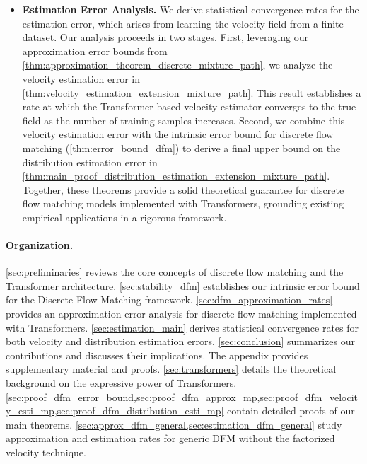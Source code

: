\documentclass[12pt]{article}
\numberwithin{equation}{section}
\let\cite\citep
\theoremstyle{theoremstyle}
\numberwithin{equation}{section}
\numberwithin{theorem}{section}
\numberwithin{proposition}{section}
\numberwithin{definition}{section}
\numberwithin{lemma}{section}
\numberwithin{assumption}{section}
\numberwithin{remark}{section}
\begin{document}
\begin{itemize}
    \item \textbf{Estimation Error Analysis.}
    We derive statistical convergence rates for the estimation error, which arises from learning the velocity field from a finite dataset. 
    Our analysis proceeds in two stages. First, leveraging our approximation error bounds from \cref{thm:approximation_theorem_discrete_mixture_path}, we analyze the velocity estimation error in \cref{thm:velocity_estimation_extension_mixture_path}. 
    This result establishes a rate at which the Transformer-based velocity estimator converges to the true field as the number of training samples increases. 
    Second, we combine this velocity estimation error with the intrinsic error bound for discrete flow matching (\cref{thm:error_bound_dfm}) to derive a final upper bound on the distribution estimation error in \cref{thm:main_proof_distribution_estimation_extension_mixture_path}. 
    Together, these theorems provide a solid theoretical guarantee for discrete flow matching models implemented with Transformers, grounding existing empirical applications \cite{fuest2025maskflow,qin2024defog,yi2025all} in a rigorous framework.
\end{itemize}

\paragraph{Organization.}
\cref{sec:preliminaries} reviews the core concepts of discrete flow matching and the Transformer architecture.
\cref{sec:stability_dfm} establishes our intrinsic error bound for the Discrete Flow Matching framework.
\cref{sec:dfm_approximation_rates} provides an approximation error analysis for discrete flow matching implemented with Transformers.
\cref{sec:estimation_main} derives statistical convergence rates for both velocity and distribution estimation errors.
\cref{sec:conclusion} summarizes our contributions and discusses their implications.
The appendix provides supplementary material and proofs.
\cref{sec:transformers} details the theoretical background on the expressive power of Transformers.
\cref{sec:proof_dfm_error_bound,sec:proof_dfm_approx_mp,sec:proof_dfm_velocity_esti_mp,sec:proof_dfm_distribution_esti_mp} contain detailed proofs of our main theorems.
\cref{sec:approx_dfm_general,sec:estimation_dfm_general} study approximation and estimation rates for generic DFM without the factorized velocity technique.
\end{document}
